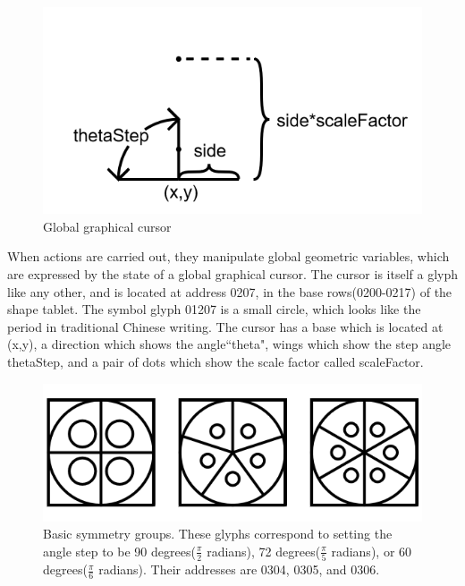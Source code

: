 \documentclass[11pt]{article}
\begin{document}
\begin{figure}
\includegraphics[width=\linewidth]{figures/figure7_globalCursor.png}
\caption{Global graphical cursor}
\end{figure}




    When actions are carried out, they manipulate global geometric variables, which are expressed by the state of a global graphical cursor.  The cursor is itself a glyph like any other, and is located at address 0207, in the base rows(0200-0217) of the shape tablet.  The symbol glyph 01207 is a small circle, which looks like the period in traditional Chinese writing.  The cursor has a base which is located at (x,y), a direction which shows the angle``theta", wings which show the step angle thetaStep, and a pair of dots which show the scale factor called scaleFactor.  




\begin{figure}
\includegraphics[width=\linewidth]{figures/figure8_symmetries.png}
\caption{Basic symmetry groups.  These glyphs correspond to setting the angle step to be 90 degrees($\frac{\pi}{2}$ radians), 72 degrees($\frac{\pi}{5}$ radians), or 60 degrees($\frac{\pi}{6}$ radians). Their addresses are 0304, 0305, and 0306. }
\end{figure}
\end{document}
